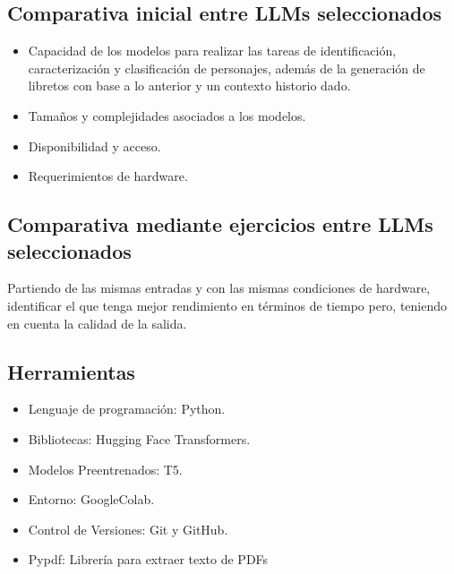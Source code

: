 \documentclass[journal,onecolumn]{IEEEtran}
\begin{document}
	\subsection{Comparativa inicial entre LLMs seleccionados}
	\begin{itemize}
		\item Capacidad de los modelos para realizar las tareas de identificación, caracterización y clasificación de personajes, además de la generación de libretos con base a lo anterior y un contexto historio dado.
		\item Tamaños y complejidades asociados a los modelos.
		\item Disponibilidad y acceso.
		\item Requerimientos de hardware.
	\end{itemize}
	\subsection{Comparativa mediante ejercicios entre LLMs seleccionados}
	Partiendo de las mismas entradas y con las mismas condiciones de hardware, identificar el que tenga mejor rendimiento en términos de tiempo pero, teniendo en cuenta la calidad de la salida.
	\subsection{Herramientas}
	\begin{itemize}
		\item Lenguaje de programación: Python.
		\item Bibliotecas: Hugging Face Transformers.
		\item Modelos Preentrenados: T5.
		\item Entorno: GoogleColab.
		\item Control de Versiones: Git y GitHub.
		\item Pypdf: Librería para extraer texto de PDFs
	\end{itemize}
	
\end{document}
